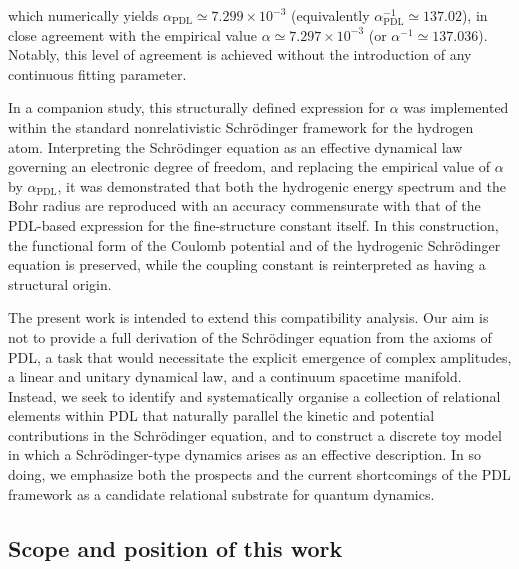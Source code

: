 \documentclass[11pt,a4paper]{article}
\begin{document}
which numerically yields $\alpha_{\mathrm{PDL}} \simeq 7.299\times 10^{-3}$ (equivalently $\alpha_{\mathrm{PDL}}^{-1} \simeq 137.02$), in close agreement with the empirical value $\alpha \simeq 7.297\times 10^{-3}$ (or $\alpha^{-1} \simeq 137.036$).\cite{Laubscher2026DerivationAlpha} Notably, this level of agreement is achieved without the introduction of any continuous fitting parameter.\par In a companion study, this structurally defined expression for $\alpha$ was implemented within the standard nonrelativistic Schr\"odinger framework for the hydrogen atom. Interpreting the Schr\"odinger equation as an effective dynamical law governing an electronic degree of freedom, and replacing the empirical value of $\alpha$ by $\alpha_{\mathrm{PDL}}$, it was demonstrated that both the hydrogenic energy spectrum and the Bohr radius are reproduced with an accuracy commensurate with that of the PDL-based expression for the fine-structure constant itself.\cite{Laubscher2026SchrodingerPDL} In this construction, the functional form of the Coulomb potential and of the hydrogenic Schr\"odinger equation is preserved, while the coupling constant is reinterpreted as having a structural origin.\par The present work is intended to extend this compatibility analysis. Our aim is not to provide a full derivation of the Schr\"odinger equation from the axioms of PDL, a task that would necessitate the explicit emergence of complex amplitudes, a linear and unitary dynamical law, and a continuum spacetime manifold. Instead, we seek to identify and systematically organise a collection of relational elements within PDL that naturally parallel the kinetic and potential contributions in the Schr\"odinger equation, and to construct a discrete toy model in which a Schr\"odinger-type dynamics arises as an effective description. In so doing, we emphasize both the prospects and the current shortcomings of the PDL framework as a candidate relational substrate for quantum dynamics.

\subsection{Scope and position of this work}
\end{document}
